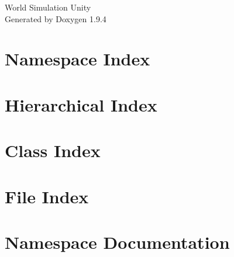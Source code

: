\documentclass[twoside]{book}
\newcommand{\+}{\discretionary{\mbox{\scriptsize$\hookleftarrow$}}{}{}}
\newcommand{\clearemptydoublepage}{%
    \newpage{\pagestyle{empty}\cleardoublepage}%
  }
\begin{document}
  \raggedbottom
    \hypersetup{pageanchor=false,
                bookmarksnumbered=true,
                pdfencoding=unicode
               }
  \begin{titlepage}
  \vspace*{7cm}
  \begin{center}%
  {\Large World Simulation Unity}\\
  \vspace*{1cm}
  {\large Generated by Doxygen 1.9.4}\\
  \end{center}
  \end{titlepage}
  \clearemptydoublepage
  \tableofcontents
  \clearemptydoublepage
  \hypersetup{pageanchor=true}
\chapter{Namespace Index}

\chapter{Hierarchical Index}

\chapter{Class Index}

\chapter{File Index}

\chapter{Namespace Documentation}


















\end{document}
